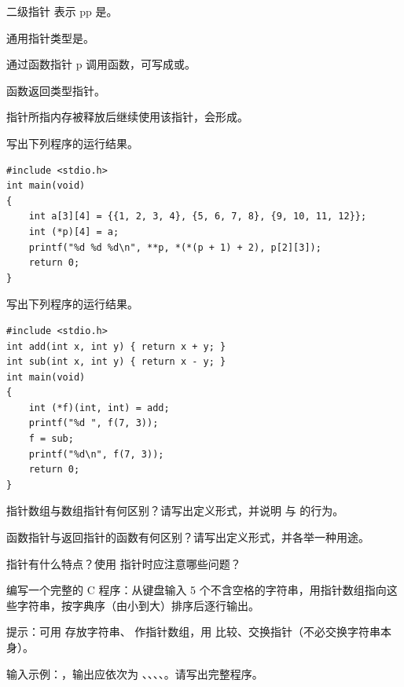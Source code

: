 \documentclass[a4paper,11pt]{article}
\begin{document}
\q 二级指针  表示 pp 是\fillblanks[2.2cm]。

\q 通用指针类型是\fillblanks[1.4cm]。

\q 通过函数指针 p 调用函数，可写成\fillblanks[1.6cm]或\fillblanks[2.2cm]。

\q {} 函数返回\fillblanks[1.6cm]类型指针。

\q 指针所指内存被释放后继续使用该指针，会形成\fillblanks[2.2cm]。

\q 写出下列程序的运行结果。
\begin{lstlisting}[language={[custom]C}]
#include <stdio.h>
int main(void)
{
    int a[3][4] = {{1, 2, 3, 4}, {5, 6, 7, 8}, {9, 10, 11, 12}};
    int (*p)[4] = a;
    printf("%d %d %d\n", **p, *(*(p + 1) + 2), p[2][3]);
    return 0;
}
\end{lstlisting}
\anslines{2.4cm}

\q 写出下列程序的运行结果。
\begin{lstlisting}[language={[custom]C}]
#include <stdio.h>
int add(int x, int y) { return x + y; }
int sub(int x, int y) { return x - y; }
int main(void)
{
    int (*f)(int, int) = add;
    printf("%d ", f(7, 3));
    f = sub;
    printf("%d\n", f(7, 3));
    return 0;
}
\end{lstlisting}
\anslines{2.6cm}

\q 指针数组与数组指针有何区别？请写出定义形式，并说明  与  的行为。\anslines{3.2cm}

\q 函数指针与返回指针的函数有何区别？请写出定义形式，并各举一种用途。\anslines{3.2cm}

\q {} 指针有什么特点？使用  指针时应注意哪些问题？\anslines{3.0cm}

\newpage
{}
\q 编写一个完整的 C 程序：从键盘输入 5 个不含空格的字符串，用指针数组指向这些字符串，按字典序（由小到大）排序后逐行输出。
\par\vspace{0.15em}
\noindent 提示：可用  存放字符串、 作指针数组，用  比较、交换指针（不必交换字符串本身）。

\noindent 输入示例：，输出应依次为 、、、、。请写出完整程序。\anslines{4.0cm}
\end{document}
